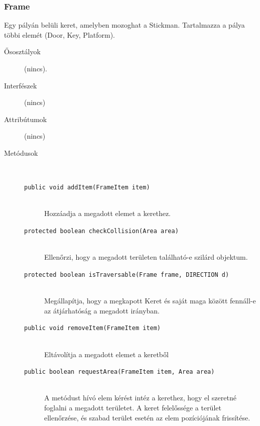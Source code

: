 		\subsubsection{Frame}
				 Egy pályán belüli keret, amelyben mozoghat a Stickman. Tartalmazza a pálya többi elemét (Door, Key, Platform). 			\begin{description}


				\item[Ősosztályok] (nincs).
				\item[Interfészek] (nincs)
				\item[Attribútumok] (nincs)
				\item[Metódusok]$\ $
					\begin{description}
						\item[\texttt{public void addItem(FrameItem item)}] \hfill \\ Hozzáadja a megadott elemet a kerethez. 
						\item[\texttt{protected boolean checkCollision(Area area)}] \hfill \\ Ellenőrzi, hogy a megadott területen  található-e szilárd objektum. 
						\item[\texttt{protected boolean isTraversable(Frame frame, DIRECTION d)}] \hfill \\ Megállapítja, hogy a megkapott Keret és saját  maga között fennáll-e az átjárhatóság a  megadott irányban. 
						\item[\texttt{public void removeItem(FrameItem item)}] \hfill \\ Eltávolítja a megadott elemet a keretből 
						\item[\texttt{public boolean requestArea(FrameItem item, Area area)}] \hfill \\ A metódust hívó elem kérést intéz a kerethez,  hogy el szeretné foglalni a megadott területet.  A keret felelőssége a terület ellenőrzése, és szabad  terület esetén az elem pozíciójának frissítése. 
					\end{description}
			\end{description}

